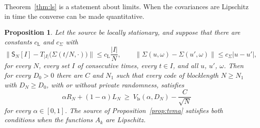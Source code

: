 \documentclass[11pt,onecolumn]{IEEEtran}
\newtheorem{proposition}[theorem]{Proposition}
\newcommand{\Vls}{V_{\mathrm{ls}}}
\begin{document}
Theorem~\ref{thm:ls} is a statement about limits. When the covariances
are Lipschitz in time the converse can be made quantitative.

\begin{proposition}\label{prop:rate}
Let the source be locally stationary, and suppose that there are
constants $c_{\mathrm L}$ and $c_\Sigma$ with
\[
\bigl\|\mathsf S_N[I]-T_{|I|}\bigl(\Sigma(t/N,\cdot)\bigr)\bigr\|\le c_{\mathrm L}\frac{|I|}{N},\qquad
\bigl\|\Sigma(u,\omega)-\Sigma(u',\omega)\bigr\|\le c_\Sigma|u-u'|,
\]
for every $N$, every set $I$ of consecutive times, every $t\in I$, and
all $u$, $u'$, $\omega$. Then for every $D_0>0$ there are $C$ and
$N_1$ such that every code of blocklength $N\ge N_1$ with
$D_N\ge D_0$, with or without private randomness, satisfies
\[
\alpha R_N+(1-\alpha)L_N\ \ge\ \Vls(\alpha,D_N)-\frac{C}{\sqrt N}
\]
for every $\alpha\in[0,1]$. The source of
Proposition~\ref{prop:tvma} satisfies both conditions when the
functions $A_k$ are Lipschitz.
\end{proposition}
\end{document}
